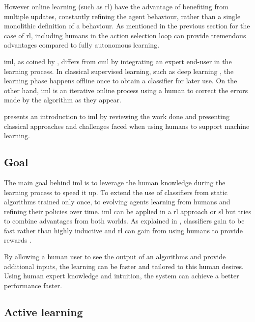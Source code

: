 However online learning (such as \gls{rl}) have the advantage of benefiting from multiple updates, constantly refining the agent behaviour, rather than a single monolithic definition of a behaviour. As mentioned in the previous section for the case of \gls{rl}, including humans in the action selection loop can provide tremendous advantages compared to fully autonomous learning.

\acrfull{iml}, as coined by \cite{fails2003interactive}, differs from \acrfull{cml} by integrating an expert end-user in the learning process. In classical supervised learning, such as deep learning \cite{lecun2015deep}, the learning phase happens offline once to obtain a classifier for later use. On the other hand, \acrshort{iml} is an iterative online process using a human to correct the errors made by the algorithm as they appear.

\cite{amershi2014power} presents an introduction to \gls{iml} by reviewing the work done and presenting classical approaches and challenges faced when using humans to support machine learning.


\subsection{Goal}

The main goal behind \gls{iml} is to leverage the human knowledge during the learning process to speed it up. To extend the use of classifiers from static algorithms trained only once, to evolving agents learning from humans and refining their policies over time. \gls{iml} can be applied in a \gls{rl} approach or \gls{sl} but tries to combine advantages from both worlds. As explained in \cite{fails2003interactive}, classifiers gain to be fast rather than highly inductive and \gls{rl} can gain from using humans to provide rewards \cite{knox2009interactively}.

By allowing a human user to see the output of an algorithms and provide additional inputs, the learning can be faster and tailored to this human desires. Using human expert knowledge and intuition, the system can achieve a better performance faster.

\subsection{Active learning} \label{ssec:back_active}

